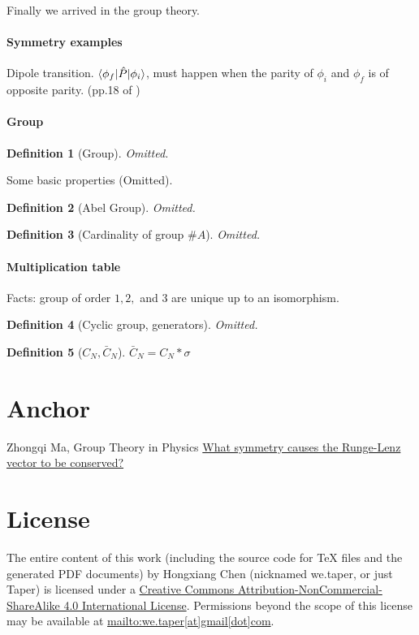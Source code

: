 \documentclass{article}
\numberwithin{equation}{subsection} %
\newtheorem{defi}{Definition}[section]
\theoremstyle{definition}
\begin{document}
Finally we arrived in the group theory.
\paragraph{Symmetry examples} Dipole transition. 
$\braket{\phi_f|\hat{P}|\phi_i}$, must happen when the parity of $\phi_i$
and $\phi_f$ is of opposite parity. (pp.18 of \cite{book})

\paragraph{Group}
\begin{defi}[Group]
    Omitted.
\end{defi}
Some basic properties (Omitted).
\begin{defi}[Abel Group]
    Omitted.
\end{defi}
\begin{defi}[Cardinality of group $\# A$]
    Omitted.
\end{defi}

\paragraph{Multiplication table}

Facts: group of order $1,2,$ and $3$ are unique up to an isomorphism.

\begin{defi}[Cyclic group, generators]
    Omitted.
\end{defi}

\begin{defi}[$C_N,\bar{C}_N$]
    $\bar{C}_N=C_N*\sigma$
\end{defi}
\section{Anchor}
\label{sec:Anchor}

\begin{thebibliography}{1}
     Zhongqi Ma, Group Theory in Physics
     \href{physics.stackexchange.com/questions/18088/what-symmetry-causes-the-runge-lenz-vector-to-be-conserved}{What symmetry causes the Runge-Lenz vector to be conserved?}
\end{thebibliography}
\printnomenclature
\section{License}
The entire content of this work (including the source code
for TeX files and the generated PDF documents) by 
Hongxiang Chen (nicknamed we.taper, or just Taper) is
licensed under a 
\href{http://creativecommons.org/licenses/by-nc-sa/4.0/}{Creative 
Commons Attribution-NonCommercial-ShareAlike 4.0 International 
License}. Permissions beyond the scope of this 
license may be available at \url{mailto:we.taper[at]gmail[dot]com}.
\end{document}

